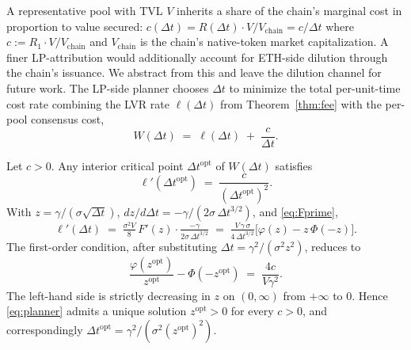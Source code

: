 \documentclass[runningheads]{llncs}
\newcommand{\dt}{\Delta t}
\newcommand{\1}{\mathbf{1}}
\begin{document}
A representative pool with TVL $V$ inherits a share of the chain's marginal cost in proportion to value secured: $c(\dt) = R(\dt) \cdot V/V_{\text{chain}} = c/\dt$ where $c := R_1 \cdot V/V_{\text{chain}}$ and $V_{\text{chain}}$ is the chain's native-token market capitalization. A finer LP-attribution would additionally account for ETH-side dilution through the chain's issuance. We abstract from this and leave the dilution channel for future work. The LP-side planner chooses $\dt$ to minimize the total per-unit-time cost rate combining the LVR rate $\ell(\dt)$ from Theorem~\ref{thm:fee} with the per-pool consensus cost,
\begin{equation}\label{eq:Wplanner}
W(\dt) \;=\; \ell(\dt) \;+\; \frac{c}{\dt}.
\end{equation}


\begin{theorem}\label{thm:planner}
Let $c > 0$. Any interior critical point $\dt^{\mathrm{opt}}$ of $W(\dt)$ satisfies
\begin{equation}\label{eq:foc}
\ell'(\dt^{\mathrm{opt}}) \;=\; \frac{c}{(\dt^{\mathrm{opt}})^2}.
\end{equation}
With $z = \gamma/(\sigma\sqrt{\dt})$, $dz/d\dt = -\gamma/(2\sigma\,\dt^{3/2})$, and \eqref{eq:Fprime},
\begin{equation}\label{eq:focexplicit}
\ell'(\dt) \;=\; \tfrac{\sigma^2 V}{8}\,F'(z)\cdot\tfrac{-\gamma}{2\sigma\,\dt^{3/2}}
\;=\; \tfrac{V\,\gamma\,\sigma}{4\,\dt^{3/2}}\big[\varphi(z) - z\,\Phi(-z)\big].
\end{equation}
The first-order condition, after substituting $\dt = \gamma^2 / (\sigma^2 z^2)$, reduces to
\begin{equation}\label{eq:planner}
\boxed{\;\frac{\varphi(z^{\mathrm{opt}})}{z^{\mathrm{opt}}} - \Phi(-z^{\mathrm{opt}}) \;=\; \frac{4c}{V\gamma^2}.\;}
\end{equation}
The left-hand side is strictly decreasing in $z$ on $(0,\infty)$ from $+\infty$ to $0$. Hence \eqref{eq:planner} admits a unique solution $z^{\mathrm{opt}}>0$ for every $c > 0$, and correspondingly $\dt^{\mathrm{opt}} = \gamma^2/(\sigma^2 (z^{\mathrm{opt}})^2)$.
\end{theorem}
\end{document}
